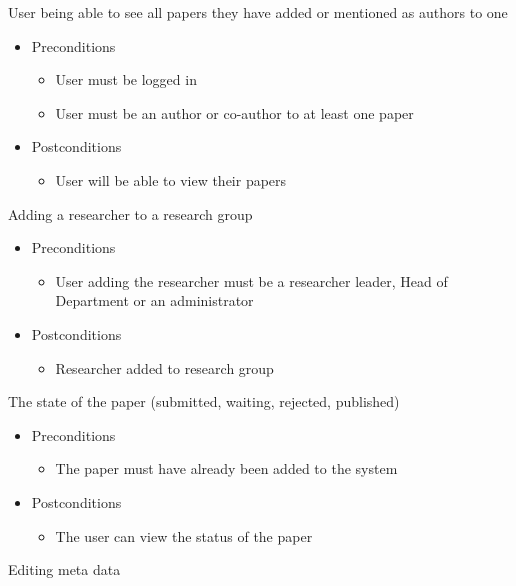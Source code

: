 \documentclass[a4paper,12pt]{article}
\begin{document}
User being able to see all papers they have added or mentioned as authors to one
\begin{itemize}
    \item Preconditions
    \begin{itemize}
        \item User must be logged in
        \item User must be an author or co-author to at least one paper
    \end{itemize}
    \item Postconditions
    \begin{itemize}
        \item User will be able to view their papers
    \end{itemize}
\end{itemize}
Adding a researcher to a research group
\begin{itemize}
    \item Preconditions
    \begin{itemize}
        \item User adding the researcher must be a researcher leader, Head of Department or an administrator
    \end{itemize}
    \item Postconditions
    \begin{itemize}
        \item Researcher added to research group
    \end{itemize}
\end{itemize}
The state of the paper (submitted, waiting, rejected, published)
\begin{itemize}
    \item Preconditions
    \begin{itemize}
        \item The paper must have already been added to the system
    \end{itemize}
    \item Postconditions
    \begin{itemize}
        \item The user can view the status of the paper
    \end{itemize}
\end{itemize}
Editing meta data
\end{document}
